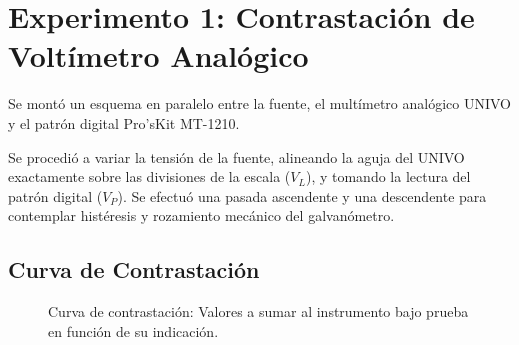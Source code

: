 \documentclass{informeutn}
\begin{document}
\section{Experimento 1: Contrastación de Voltímetro Analógico}
Se montó un esquema en paralelo entre la fuente, el multímetro analógico UNIVO y el patrón digital Pro'sKit MT-1210. 

Se procedió a variar la tensión de la fuente, alineando la aguja del UNIVO exactamente sobre las divisiones de la escala ($V_L$), y tomando la lectura del patrón digital ($V_P$). Se efectuó una pasada ascendente y una descendente para contemplar histéresis y rozamiento mecánico del galvanómetro.

\begin{table}[H]
    \centering
    \caption{Valores obtenidos de la contrastación. $V_L$: indicado, $V_P$: patrón, $\Delta V$: Error absoluto.}
\end{table}

\subsection{Curva de Contrastación}
\begin{figure}[H]
    \centering
    \caption{Curva de contrastación: Valores a sumar al instrumento bajo prueba en función de su indicación.}
\end{figure}
\end{document}
